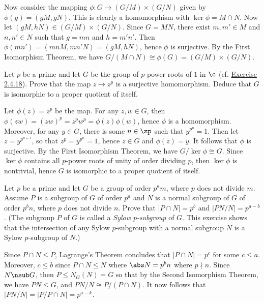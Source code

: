 \begin{problems}
\begin{sol}
\begin{center}
        \end{center}
        Now consider the mapping $\phi : G \to (G/M) \times (G/N)$ given by $\phi(g) = (gM, gN)$. This is clearly a homomorphism with $\ker\phi = M \cap N$. Now let $(gM, hN) \in (G/M) \times (G/N)$. Since $G = MN$, there exist $m, m' \in M$ and $n, n' \in N$ such that $g = mn$ and $h = m'n'$. Then $\phi(mn') = (mnM, mn'N) = (gM, hN)$, hence $\phi$ is surjective. By the First Isomorphism Theorem, we have $G/(M \cap N) \cong \phi(G) = (G/M) \times (G/N)$.
    \end{sol}
    \item Let $p$ be a prime and let $G$ be the group of $p$-power roots  of $1$ in $\c$ (cf. \hyperref[ex2.4.18]{Exercise 2.4.18}). Prove that the map $z \mapsto z^p$ is a surjective homomorphism. Deduce that $G$ is isomorphic to a proper quotient of itself.
    \begin{sol}
        Let $\phi(z) = z^p$ be the map. For any $z, w \in G$, then $\phi(zw) = (zw)^p = z^p w^p = \phi(z)\phi(w)$, hence $\phi$ is a homomorphism. Moreover, for any $y \in G$, there is some $n \in \zp$ such that $y^{p^n} = 1$. Then let $z = y^{p^{n - 1}}$, so that $z^p = y^{p^n} = 1$, hence $z \in G$ and $\phi(z) = y$. It follows that $\phi$ is surjective. By the First Isomorphism Theorem, we have $G/\ker\phi \cong G$. Since $\ker\phi$ contains all $p$-power roots of unity of order dividing $p$, then $\ker\phi$ is nontrivial, hence $G$ is isomorphic to a proper quotient of itself.
    \end{sol}
    \item Let $p$ be a prime and let $G$ be a group of order $p^am$, where $p$ does not divide $m$. Assume $P$ is a subgroup of $G$ of order $p^a$ and $N$ is a normal subgroup of $G$ of order $p^b n$, where $p$ does not divide $n$. Prove that $|P \cap N| = p^b$ and $|PN/N| = p^{a - b}$. (The subgroup $P$ of $G$ is called a \textit{Sylow $p$-subgroup} of $G$. This exercise shows that the intersection of any Sylow $p$-subgroup with a normal subgroup $N$ is a Sylow $p$-subgroup of $N$.)
    \begin{sol}
        Since $P \cap N \leq P$, Lagrange's Theorem concludes that $|P \cap N| = p^c$ for some $c \leq a$. Moreover, $c \leq b$ since $P \cap N \leq N$ where $\abs N = p^b n$ where $p \nmid n$. Since $N \nsub G$, then $P \leq N_G(N) = G$ so that by the Second Isomorphism Theorem, we have $PN \leq G$, and $PN/N \cong P/(P \cap N)$. It now follows that $|PN/N| = |P/P \cap N| = p^{a - k}$.


\end{sol}
\end{problems}

